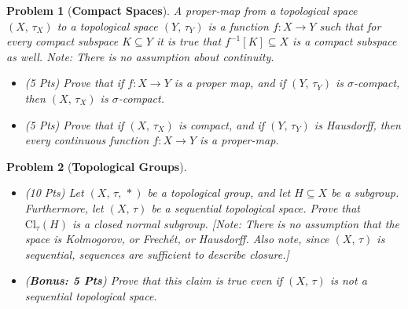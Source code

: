 \documentclass{article}
\theoremstyle{normal}
\newtheorem{problem}{Problem}
\begin{document}
    \begin{problem}[\textbf{Compact Spaces}]
        A \textit{proper-map} from a topological space $(X,\,\tau_{X})$ to a
        topological space $(Y,\,\tau_{Y})$ is a function
        $f:X\rightarrow{Y}$ such that for every compact subspace
        $K\subseteq{Y}$ it is true that $f^{-1}[K]\subseteq{X}$ is a compact
        subspace as well. Note: There is no assumption about continuity.
        \begin{itemize}
            \item (5 Pts) Prove that if $f:X\rightarrow{Y}$ is a proper map,
                and if $(Y,\,\tau_{Y})$ is $\sigma$-compact, then
                $(X,\,\tau_{X})$ is $\sigma$-compact.
            \item (5 Pts) Prove that if $(X,\,\tau_{X})$ is compact, and if
                $(Y,\,\tau_{Y})$ is Hausdorff, then every continuous function
                $f:X\rightarrow{Y}$ is a proper-map.
        \end{itemize}
    \end{problem}
    \begin{problem}[\textbf{Topological Groups}]
        \par\hfill\par
        \begin{itemize}
            \item (10 Pts) Let $(X,\,\tau,\,*)$ be a topological group, and let
                $H\subseteq{X}$ be a subgroup. Furthermore, let
                $(X,\,\tau)$ be a sequential topological space. Prove that
                $\textrm{Cl}_{\tau}(H)$ is a closed normal subgroup.
                [Note: There is no assumption that the space is Kolmogorov, or
                Frech\'{e}t, or Hausdorff. Also note, since $(X,\,\tau)$ is
                sequential, sequences are sufficient to describe closure.]
            \item (\textbf{Bonus: 5 Pts}) Prove that this claim is true even
                if $(X,\,\tau)$ is not a sequential topological space.
        \end{itemize}
    \end{problem}
\end{document}
